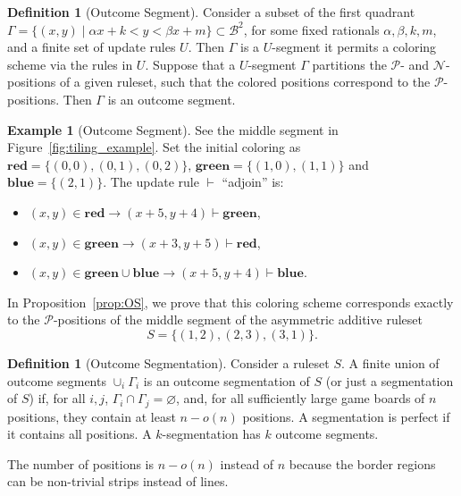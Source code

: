 \documentclass{amsart}
\theoremstyle{plain}
\theoremstyle{definition}
\newtheorem{defi}[thm]{Definition}
\newtheorem{example}[thm]{Example}
\newcommand{\N}{\ensuremath{\mathcal N}}
\renewcommand{\P}{\ensuremath{\mathcal P}}
\newcommand{\B}{\mathcal B}
\newcommand{\ur}[1]{\textcolor{red}{#1}}
\begin{document}
\begin{defi}[Outcome Segment]
\label{def:outcomesegment}
   Consider a subset of the first quadrant $\Gamma=\{(x,y)\mid \alpha x +k<y <\beta x+m\}\subset \B^2$, for some fixed rationals $\alpha, \beta, k, m$, and a finite set of update rules $U$. Then $\Gamma$ is a  $U$-segment it permits a coloring scheme via the rules in $U$. Suppose that a $U$-segment $\Gamma$ partitions the \P- and \N-positions of a given ruleset, such that the colored positions correspond to the \P-positions. Then $\Gamma$ is an outcome segment.
   \end{defi}
\begin{example}[Outcome Segment]\label{ex:OS}
    See the middle segment in Figure~\ref{fig:tiling_example}. Set the initial coloring as $\mathbf{red}=\{(0,0),(0,1),(0,2)\}$, $\mathbf{green}=\{(1,0),(1,1)\}$ and $\mathbf{blue}=\{(2,1)\}$. The update rule $\vdash$ ``adjoin'' is: 
    \begin{itemize}
        \item $(x,y)\in \mathbf{red}\rightarrow (x+5,y+4)\vdash  \mathbf{green}$,
        \item $(x,y)\in \mathbf{green}\rightarrow (x+3,y+5)\vdash \mathbf{red}$,
        \item $(x,y)\in \mathbf{gre  en}\cup \mathbf{blue}\rightarrow (x+5,y+4)\vdash \mathbf{blue}$.
    \end{itemize}
    In Proposition~\ref{prop:OS}, we prove that this coloring scheme corresponds exactly to the \P-positions of the middle segment of the {\sc asymmetric additive} ruleset $$S=\{(1,2),(2,3),(3,1)\}.$$
\end{example}

\begin{defi}[Outcome Segmentation]
\label{def:outcomesegmentation}
    Consider a ruleset $S$. A finite union of outcome segments $\cup_{i}\Gamma_i$ is an outcome segmentation of $S$ (or just a segmentation of $S$) if, for all $i,j$, $\Gamma_i\cap \Gamma_j=\varnothing$, and, for all sufficiently large game boards of $n$ positions, they contain at least $n-o(n)$ positions.  A segmentation is perfect if it contains all positions. A $k$-segmentation has $k$ outcome segments. 
\end{defi}
The number of positions is $n-o(n)$ instead of $n$  because the border regions can be non-trivial strips instead of lines.
\end{document}
